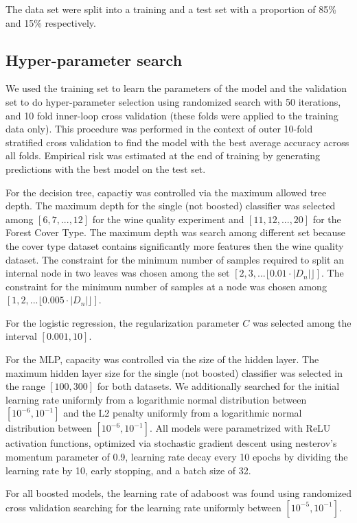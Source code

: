 \documentclass{article}
\begin{document}
The data set were split into a training and a test set with a proportion of 85\% and 15\% respectively.

\subsection{Hyper-parameter search}
We used the training set to learn the parameters of the model and the validation set to do hyper-parameter selection using randomized search \cite{Berg} with 50 iterations, and 10 fold inner-loop cross validation (these folds were applied to the training data only). This procedure was performed in the context of outer 10-fold stratified cross validation to find the model with the best average accuracy across all folds. Empirical risk was estimated at the end of training by generating predictions with the best model on the test set. 

For the decision tree, capactiy was controlled via the maximum allowed tree depth. The maximum depth for the single (not boosted) classifier was selected among $[6, 7,...,12]$ for the wine quality experiment and $[11, 12, ..., 20]$ for the Forest Cover Type. The maximum depth was search among different set because the cover type dataset contains significantly more features then the wine quality dataset. The constraint for the minimum number of samples required to split an internal node in two leaves was chosen among the set $[2, 3, ... \lfloor 0.01\cdot |D_n|\rfloor]$. The constraint for the minimum number of samples at a node was chosen among $[1, 2, ... \lfloor 0.005\cdot |D_n|\rfloor]$.

For the logistic regression, the regularization parameter $C$ was selected among the interval $[0.001, 10]$.

For the MLP, capacity was controlled via the size of the hidden layer. The maximum hidden layer size for the single (not boosted) classifier was selected in the range $[100, 300]$ for both datasets. We additionally searched for the initial learning rate uniformly from a logarithmic normal distribution between $[10^{-6}, 10^{-1}]$ and the L2 penalty uniformly from a logarithmic normal distribution between $[10^{-6}, 10^{-1}]$. All models were parametrized with ReLU activation functions, optimized via stochastic gradient descent using nesterov's momentum parameter of 0.9, learning rate decay every 10 epochs by dividing the learning rate by 10, early stopping, and a batch size of 32.

For all boosted models, the learning rate of adaboost was found using randomized cross validation searching for the learning rate uniformly between $[10^{-5}, 10^{-1}]$.
\end{document}
